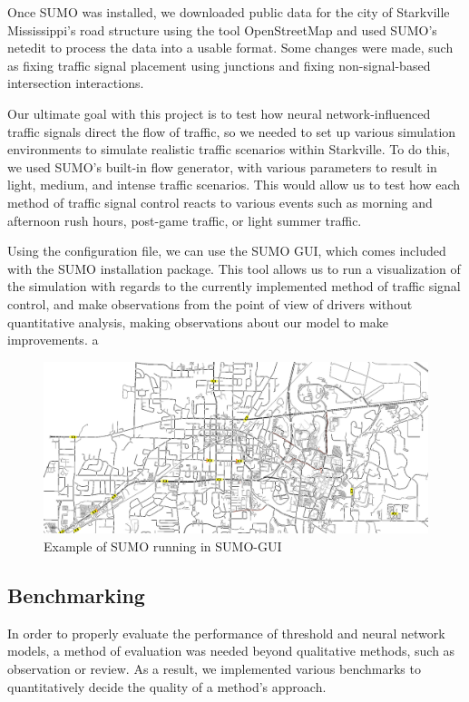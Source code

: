 \documentclass[conference]{IEEEtran}
\begin{document}
Once SUMO was installed, we downloaded public data for the city of Starkville Mississippi's road structure using the tool OpenStreetMap and used SUMO's netedit to process the data into a usable format. Some changes were made, such as fixing traffic signal placement using junctions and fixing non-signal-based intersection interactions. 

Our ultimate goal with this project is to test how neural network-influenced traffic signals direct the flow of traffic, so we needed to set up various simulation environments to simulate realistic traffic scenarios within Starkville. To do this, we used SUMO's built-in flow generator, with various parameters to result in light, medium, and intense traffic scenarios. This would allow us to test how each method of traffic signal control reacts to various events such as morning and afternoon rush hours, post-game traffic, or light summer traffic. 

Using the configuration file, we can use the SUMO GUI, which comes included with the SUMO installation package. This tool allows us to run a visualization of the simulation with regards to the currently implemented method of traffic signal control, and make observations from the point of view of drivers without quantitative analysis, making observations about our model to make improvements. a

\begin{figure}[H]
    \centering
    \includegraphics[width=0.9\linewidth]{SUMO_RUNNING.png}
    \caption{Example of SUMO running in SUMO-GUI}
\end{figure}

\subsection{Benchmarking}

In order to properly evaluate the performance of threshold and neural network models, a method of evaluation was needed beyond qualitative methods, such as observation or review. As a result, we implemented various benchmarks to quantitatively decide the quality of a method's approach. 
\end{document}
